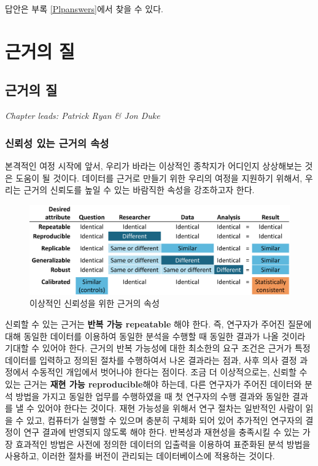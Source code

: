 \documentclass[10.5pt]{book}
\theoremstyle{definition}
\theoremstyle{definition}
\theoremstyle{definition}
\theoremstyle{remark}
\begin{document}
답안은 부록 \ref{Plpanswers}에서 찾을 수 있다.

\part{근거의 질}\label{part--}

\chapter{근거의 질}\label{EvidenceQuality}

\emph{Chapter leads: Patrick Ryan \& Jon Duke}


\section{신뢰성 있는 근거의 속성}\label{---}

본격적인 여정 시작에 앞서, 우리가 바라는 이상적인 종착지가 어디인지
상상해보는 것은 도움이 될 것이다. 데이터를 근거로 만들기 위한 우리의
여정을 지원하기 위해서, 우리는 근거의 신뢰도를 높일 수 있는 바람직한
속성을 강조하고자 한다.

\begin{figure}

{\centering \includegraphics[width=1\linewidth]{images/EvidenceQuality/reliableevidenceattributes} 

}

\caption{이상적인 신뢰성을 위한 근거의 속성}\label{fig:attributesOfEvidence}
\end{figure}

신뢰할 수 있는 근거는 \textbf{반복 가능 repeatable} 해야 한다. 즉,
연구자가 주어진 질문에 대해 동일한 데이터를 이용하여 동일한 분석을
수행할 때 동일한 결과가 나올 것이라 기대할 수 있어야 한다. 근거의 반복
가능성에 대한 최소한의 요구 조건은 근거가 특정 데이터를 입력하고 정의된
절차를 수행하여서 나온 결과라는 점과, 사후 의사 결정 과정에서 수동적인
개입에서 벗어나야 한다는 점이다. 조금 더 이상적으로는, 신뢰할 수 있는
근거는 \textbf{재현 가능 reproducible}해야 하는데, 다른 연구자가 주어진
데이터와 분석 방법을 가지고 동일한 업무를 수행하였을 때 첫 연구자의 수행
결과와 동일한 결과를 낼 수 있어야 한다는 것이다. 재현 가능성을 위해서
연구 절차는 일반적인 사람이 읽을 수 있고, 컴퓨터가 실행할 수 있으며
충분히 구체화 되어 있어 추가적인 연구자의 결정이 연구 결과에 반영되지
않도록 해야 한다. 반복성과 재현성을 충족시킬 수 있는 가장 효과적인
방법은 사전에 정의한 데이터의 입출력을 이용하여 표준화된 분석 방법을
사용하고, 이러한 절차를 버전이 관리되는 데이터베이스에 적용하는 것이다.
\end{document}

